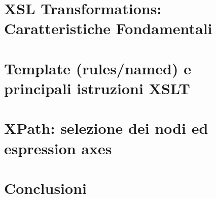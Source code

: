 \documentclass{beamer}
\begin{document}
    
    \section{XSL Transformations: Caratteristiche Fondamentali}
    
    
    \section{Template (rules/named) e principali istruzioni XSLT}
    
    
    \section{XPath: selezione dei nodi ed espression axes}
    
    
    \section{Conclusioni}
    
    
    
\end{document}
